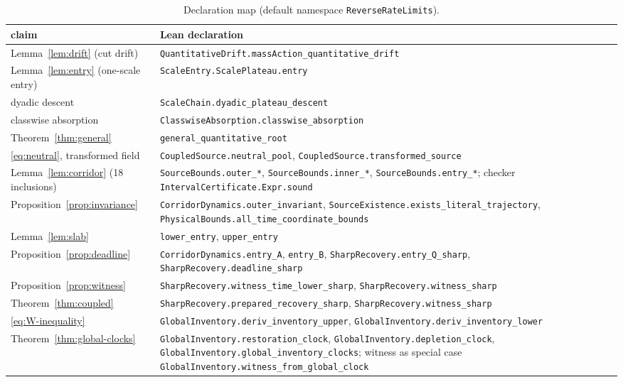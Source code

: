 \documentclass[11pt,a4paper]{article}
\theoremstyle{plain}
\theoremstyle{definition}
\theoremstyle{remark}
\newcommand{\lean}[1]{\texttt{#1}}
\begin{document}
\begin{table}[htb]
\centering\small
\caption{Declaration map (default namespace \lean{ReverseRateLimits}).}
\label{tab:declarations}
\begin{tabular}{>{\raggedright\arraybackslash}p{.33\linewidth}>{\raggedright\arraybackslash}p{.60\linewidth}}
\toprule
claim & Lean declaration\\
\midrule
Lemma~\ref{lem:drift} (cut drift) & \lean{QuantitativeDrift.massAction\_quantitative\_drift}\\
Lemma~\ref{lem:entry} (one-scale entry) & \lean{ScaleEntry.ScalePlateau.entry}\\
dyadic descent & \lean{ScaleChain.dyadic\_plateau\_descent}\\
classwise absorption & \lean{ClasswiseAbsorption.classwise\_absorption}\\
Theorem~\ref{thm:general} & \lean{general\_quantitative\_root}\\
\eqref{eq:neutral}, transformed field & \lean{CoupledSource.neutral\_pool}, \lean{CoupledSource.transformed\_source}\\
Lemma~\ref{lem:corridor} (18 inclusions) & \lean{SourceBounds.outer\_*}, \lean{SourceBounds.inner\_*}, \lean{SourceBounds.entry\_*}; checker \lean{IntervalCertificate.Expr.sound}\\
Proposition~\ref{prop:invariance} & \lean{CorridorDynamics.outer\_invariant}, \lean{SourceExistence.exists\_literal\_trajectory}, \lean{PhysicalBounds.all\_time\_coordinate\_bounds}\\
Lemma~\ref{lem:slab} & \lean{lower\_entry}, \lean{upper\_entry}\\
Proposition~\ref{prop:deadline} & \lean{CorridorDynamics.entry\_A}, \lean{entry\_B}, \lean{SharpRecovery.entry\_Q\_sharp}, \lean{SharpRecovery.deadline\_sharp}\\
Proposition~\ref{prop:witness} & \lean{SharpRecovery.witness\_time\_lower\_sharp}, \lean{SharpRecovery.witness\_sharp}\\
Theorem~\ref{thm:coupled} & \lean{SharpRecovery.prepared\_recovery\_sharp}, \lean{SharpRecovery.witness\_sharp}\\
\eqref{eq:W-inequality} & \lean{GlobalInventory.deriv\_inventory\_upper}, \lean{GlobalInventory.deriv\_inventory\_lower}\\
Theorem~\ref{thm:global-clocks} & \lean{GlobalInventory.restoration\_clock}, \lean{GlobalInventory.depletion\_clock}, \lean{GlobalInventory.global\_inventory\_clocks}; witness as special case \lean{GlobalInventory.witness\_from\_global\_clock}\\

\end{tabular}
\end{table}
\end{document}
